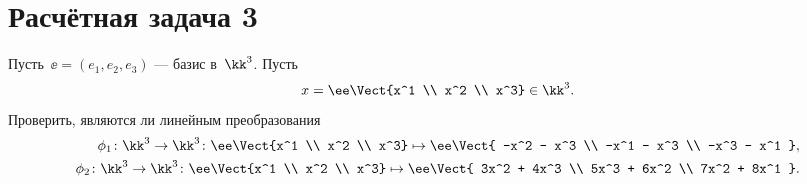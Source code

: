 \section{Расчётная задача 3}

Пусть~$\ee = (e_1, e_2, e_3)$ --- базис в~$\kk^3$.
Пусть
\[
	x =
	\ee
	\Vect{x^1 \\ x^2 \\ x^3}
	\in \kk^3
	.
\]
Проверить, являются ли линейным преобразования
\begin{align*}
	\phi_1 \colon \kk^3 \to \kk^3 \colon
	\ee
	\Vect{x^1 \\ x^2 \\ x^3}
	\mapsto
	\ee
	\Vect{
		-x^2 - x^3
		\\
		-x^1 - x^3
		\\
		-x^3 - x^1
	},
	\\
	\phi_2 \colon \kk^3 \to \kk^3 \colon
	\ee
	\Vect{x^1 \\ x^2 \\ x^3}
	\mapsto
	\ee
	\Vect{
		3x^2 + 4x^3
		\\
		5x^3 + 6x^2
		\\
		7x^2 + 8x^1
	}.
\end{align*}

